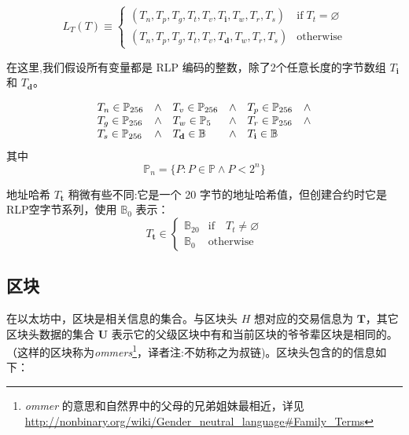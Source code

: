 \documentclass[9pt,oneside]{amsart}
\begin{document}
\begin{multicols}{2}
\begin{equation}
L_T(T) \equiv \begin{cases}
(T_n, T_p, T_g, T_t, T_v, T_\mathbf{i}, T_w, T_r, T_s) & \text{if} \; T_t = \varnothing\\
(T_n, T_p, T_g, T_t, T_v, T_\mathbf{d}, T_w, T_r, T_s) & \text{otherwise}
\end{cases}
\end{equation}

在这里,我们假设所有变量都是 RLP 编码的整数，除了2个任意长度的字节数组 $T_\mathbf{i}$ 和 $T_\mathbf{d}$。

\begin{equation}
\begin{array}[t]{lclclc}
T_n \in \mathbb{P}_{256} & \wedge & T_v \in \mathbb{P}_{256} & \wedge & T_p \in \mathbb{P}_{256} & \wedge \\
T_g \in \mathbb{P}_{256} & \wedge & T_w \in \mathbb{P}_5 & \wedge & T_r \in \mathbb{P}_{256} & \wedge \\
T_s \in \mathbb{P}_{256} & \wedge & T_\mathbf{d} \in \mathbb{B} & \wedge & T_\mathbf{i} \in \mathbb{B}
\end{array}
\end{equation}
其中
\begin{equation}
\mathbb{P}_n = \{ P: P \in \mathbb{P} \wedge P < 2^n \}
\end{equation}

地址哈希 $T_\mathbf{t}$ 稍微有些不同:它是一个 20 字节的地址哈希值，但创建合约时它是RLP空字节系列，使用 $\mathbb{B}_0$ 表示：
\begin{equation}
T_\mathbf{t} \in \begin{cases} \mathbb{B}_{20} & \text{if} \quad T_t \neq \varnothing \\
\mathbb{B}_{0} & \text{otherwise}\end{cases}
\end{equation}

\subsection{区块} \label{ch:block}

在以太坊中，区块是相关信息的集合。与区块头 $H$ 想对应的交易信息为 $\mathbf{T}$，其它区块头数据的集合 $\mathbf{U}$  表示它的父级区块中有和当前区块的爷爷辈区块是相同的。（这样的区块称为\textit{ommers}\footnote{\textit{ommer} 的意思和自然界中的父母的兄弟姐妹最相近，详见 \url{http://nonbinary.org/wiki/Gender_neutral_language#Family_Terms}}，译者注:不妨称之为叔链)。区块头包含的的信息如下：



\end{multicols}
\end{document}
